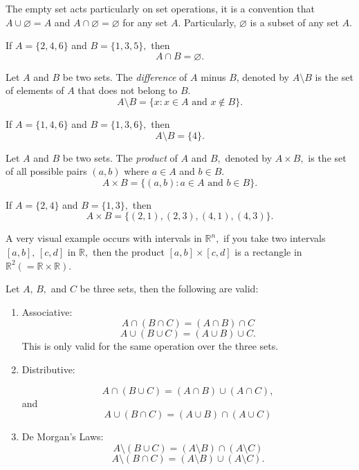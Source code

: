 \documentclass[
	fontsize=10pt, %
	twoside=false, %
	secnumdepth=1, %
]{kaobook}
\begin{document}
The empty set acts particularly on set operations, it is a convention that $A\cup \varnothing =A$ and $A\cap \varnothing= \varnothing$ for any set $A.$ Particularly, $\varnothing$ is a subset of any set $A.$


\begin{example}
If $A=\{2,4,6\}$ and $B=\{1,3,5\},$ then $$A\cap B=\varnothing.$$
\end{example}

\begin{definition}[Difference]
Let $A$ and $B$ be two sets. The \emph{difference} of $A$ minus $B$, denoted by $A\setminus B$ is the set of elements of $A$ that does not belong to $B.$ $$A\setminus B=\{x: x\in A\mbox{ and }x\not\in B \}.$$
\end{definition}

\begin{example}
If $A=\{1,4,6\}$ and $B=\{1,3,6\},$ then $$A\setminus B=\{4\}.$$
\end{example}


\begin{definition}[Product]
Let $A$ and $B$ be two sets. The \emph{product} of $A$ and $B,$ denoted by $A\times B,$ is the set of all possible pairs $(a,b)$ where $a\in A$ and $b\in B.$ $$A\times B =\{(a,b): a\in A\mbox{ and }b\in B\}.$$
\end{definition}

\begin{example}
If $A=\{2,4\}$ and $B=\{1,3\},$ then $$A\times B=\{(2,1),(2,3),(4,1),(4,3)\}.$$
\end{example}

A very visual example occurs with intervals in $\mathbb{R}^n,$ if you take two intervals $[a,b],\,[c,d]$ in $\mathbb{R},$ then the product $[a,b]\times [c,d]$ is a rectangle in $\mathbb{R}^2 (=\mathbb{R}\times \mathbb{R}).$

\begin{lemma}
Let $A,\, B,$ and $C$ be three sets, then the following are valid:
\begin{enumerate}
\item Associative: $$A\cap(B\cap C)=(A\cap B)\cap C$$ $$A\cup(B\cup C)=(A\cup B)\cup C.$$
This is only valid for the same operation over the three sets.

\item Distributive:

$$A\cap(B\cup C)=(A\cap B)\cup (A\cap C),$$ and $$A\cup(B\cap C)=(A\cup B)\cap (A\cup C)$$

\item De Morgan's Laws: $$A \setminus (B\cup C) = (A\setminus B)\cap (A\setminus C)$$ $$A\setminus (B\cap C) =(A \setminus B)\cup (A\setminus C).$$
\end{enumerate}
\end{lemma}
\end{document}
